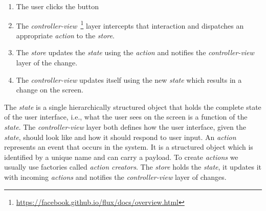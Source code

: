 \begin{enumerate}
\item The user clicks the button
\item The \emph{controller-view}~\footnote{\url{https://facebook.github.io/flux/docs/overview.html}} layer intercepts that interaction and dispatches an appropriate \emph{action} to the \emph{store}.
\item The \emph{store} updates the \emph{state} using the \emph{action} and notifies the \emph{controller-view} layer of the change.
\item The \emph{controller-view} updates itself using the new \emph{state} which results in a change on the screen.
\end{enumerate}

The \emph{state} is a single hierarchically structured object that holds the complete state of the user interface, i.e., what the user sees on the screen is a function of the \emph{state}. The \emph{controller-view} layer both defines how the user interface, given the \emph{state}, should look like and how it should respond to user input. An \emph{action} represents an event that occurs in the system. It is a structured object which is identified by a unique name and can carry a payload. To create \emph{actions} we usually use factories called \emph{action creators}. The \emph{store} holds the \emph{state}, it updates it with incoming \emph{actions} and notifies the \emph{controller-view} layer of changes.

